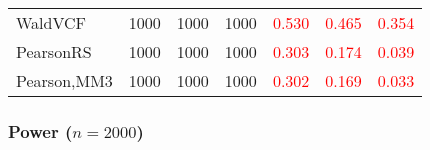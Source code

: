 \documentclass[
]{article}
\begin{document}
\begin{table}[H]
{\begin{tabular}[t]{lrrrrrr}
\hspace{1em}WaldVCF & 1000 & 1000 & 1000 & \textcolor{red}{0.530} & \textcolor{red}{0.465} & \textcolor{red}{0.354}\\
\hspace{1em}PearsonRS & 1000 & 1000 & 1000 & \textcolor{red}{0.303} & \textcolor{red}{0.174} & \textcolor{red}{0.039}\\
\hspace{1em}Pearson,MM3 & 1000 & 1000 & 1000 & \textcolor{red}{0.302} & \textcolor{red}{0.169} & \textcolor{red}{0.033}\\
\bottomrule
\end{tabular}}
\endgroup{}
\end{table}

\hypertarget{power-n2000-2}{%
\subsubsection{\texorpdfstring{Power
(\(n=2000\))}{Power (n=2000)}}\label{power-n2000-2}}
\end{document}
